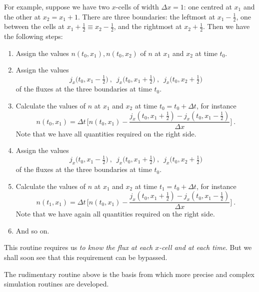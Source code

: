 \documentclass[a4paper,12pt,%
onecolumn,oneside,titlepage,%
british%
]{memoir}
\newcommand*{\incr}{\Delta}%
\renewcommand*{\|}[1][]{\nonscript\:#1\vert\nonscript\:\mathopen{}}
\newcommand*{\yti}{t_{0}}
\newcommand*{\ytf}{t_{1}}
\newcommand*{\Dt}{\incr t}
\newcommand*{\Dx}{\incr x}
\begin{document}
For example, suppose we have two $x$-cells of width $\Dx=1$: one centred at $x_{1}$ and the other at $x_{2} = x_{1}+1$. There are three boundaries: the leftmost at $x_{1}-\tfrac12$, one between the cells at $x_{1}+\tfrac12 \equiv x_{2}-\tfrac12$, and the rightmost at $x_{2}+\tfrac12$. Then we have the following steps:

{\small
  
\begin{enumerate}[label=\arabic*.]
\item Assign the values $n(\yti,x_{1}), n(\yti,x_{2})$ of $n$ at $x_{1}$ and $x_{2}$ at time $\yti$.
  
\item Assign the values $$j_{x}\bigl(\yti,x_{1}-\tfrac12\bigr)\ , \enspace j_{x}\bigl(\yti,x_{1}+\tfrac12\bigr)\ , \enspace j_{x}\bigl(\yti,x_{2}+\tfrac12\bigr)$$
  of the fluxes at the three boundaries at time $\yti$.
  
\item Calculate the values of $n$ at $x_{1}$ and $x_{2}$ at time $\yti=\yti+\Dt$, for instance
  $$ n(\yti,x_{1}) =
  \Dt\,\biggl[ n(\yti,x_{1}) - \frac{j_{x}(\yti, x_{1}+\tfrac12)-j_{x}(\yti,x_{1}-\tfrac12)}{\Dx} \biggr] \ .$$
  Note that we have all quantities required on the right side.
  
\item Assign the values $$j_{x}\bigl(\yti,x_{1}-\tfrac12\bigr)\ , \enspace j_{x}\bigl(\yti,x_{1}+\tfrac12\bigr)\ , \enspace j_{x}\bigl(\yti,x_{2}+\tfrac12\bigr)$$
  of the fluxes at the three boundaries at time $\yti$.
  
\item Calculate the values of $n$ at $x_{1}$ and $x_{2}$ at time $\ytf=\yti+\Dt$, for instance
  $$ n(\ytf,x_{1}) =
  \Dt\,\biggl[ n(\yti,x_{1}) - \frac{j_{x}(\yti, x_{1}+\tfrac12)-j_{x}(\yti,x_{1}-\tfrac12)}{\Dx} \biggr] \ .$$
  Note that we have again all quantities required on the right side.

\item And so on.
\end{enumerate}

}

This routine requires us \emph{to know the flux at each $x$-cell and at each time}. But we shall soon see that this requirement can be bypassed.

The rudimentary routine above is the basis from which more precise and complex simulation routines are developed.
\end{document}
